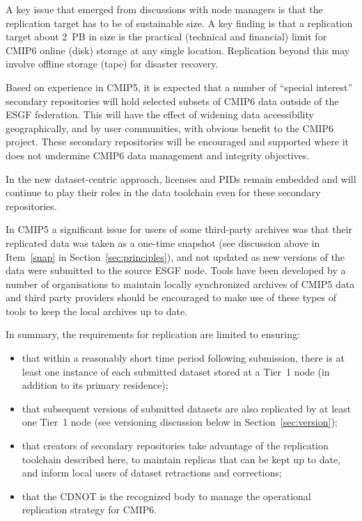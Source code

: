 \documentclass[gmd,manuscript]{copernicus}
\begin{document}
A key issue that emerged from discussions with node managers is that
the replication target has to be of sustainable size. A key finding is
that a replication target about 2~PB in size is the practical
(technical and financial) limit for CMIP6 online (disk) storage at any
single location. Replication beyond this may involve offline storage
(tape) for disaster recovery.

Based on experience in CMIP5, it is expected that a number of
``special interest'' secondary repositories will hold selected subsets
of CMIP6 data outside of the ESGF federation. This will have the
effect of widening data accessibility geographically, and by user
communities, with obvious benefit to the CMIP6 project. These
secondary repositories will be encouraged and supported where it does
not undermine CMIP6 data management and integrity objectives.

In the new dataset-centric approach, licenses and PIDs remain embedded
and will continue to play their roles in the data toolchain even for
these secondary repositories.

In CMIP5 a significant issue for users of some third-party archives
was that their replicated data was taken as a one-time snapshot (see
discussion above in Item~\ref{snap} in Section~\ref{sec:principles}),
and not updated as new versions of the data were submitted to the
source ESGF node. Tools have been developed by a number of
organisations to maintain locally synchronized archives of CMIP5 data
and third party providers should be encouraged to make use of these
types of tools to keep the local archives up to date.

In summary, the requirements for replication are limited to ensuring:

\begin{itemize}
\item that within a reasonably short time period following submission,
  there is at least one instance of each submitted dataset stored at a
  Tier~1 node (in addition to its primary residence);
\item that subsequent versions of submitted datasets are also
  replicated by at least one Tier~1 node (see versioning discussion
  below in Section~\ref{sec:version});
\item that creators of secondary repositories take advantage of the
  replication toolchain described here, to maintain replicas that can
  be kept up to date, and inform local users of dataset retractions
  and corrections;
\item that the CDNOT is the recognized body to manage the operational
  replication strategy for CMIP6.
\end{itemize}
\end{document}
